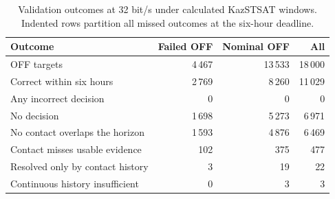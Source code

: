 \begin{table}[!htb]\centering\small
\caption{Validation outcomes at 32 bit/s under calculated KazSTSAT windows. Indented rows partition all missed outcomes at the six-hour deadline.}\label{tab:attribution}
\begin{tabular}{@{}lrrr@{}}\toprule
Outcome & Failed OFF & Nominal OFF & All\\\midrule
OFF targets & 4\,467 & 13\,533 & 18\,000\\
Correct within six hours & 2\,769 & 8\,260 & 11\,029\\
Any incorrect decision & 0 & 0 & 0\\
No decision & 1\,698 & 5\,273 & 6\,971\\
\quad No contact overlaps the horizon & 1\,593 & 4\,876 & 6\,469\\
\quad Contact misses usable evidence & 102 & 375 & 477\\
\quad Resolved only by contact history & 3 & 19 & 22\\
\quad Continuous history insufficient & 0 & 3 & 3\\
\bottomrule\end{tabular}\end{table}
